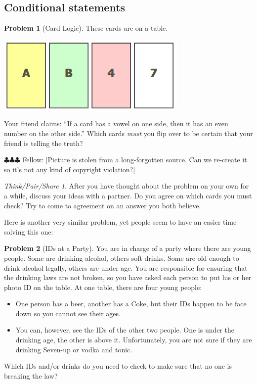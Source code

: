 \documentclass[10pt, reqno]{amsart}
\theoremstyle{remark}
\newtheorem*{thinkpair*}{Think/Pair/Share}
\theoremstyle{definition}
\newtheorem{problem}{Problem}
\numberwithin{equation}{section}  %
\newcommand{\fellow}[1]{{\color{magenta} \sf $\clubsuit\clubsuit\clubsuit$ Fellow: [#1]}}
\begin{document}
\subsection{Conditional statements}
\begin{problem}[Card Logic]
These cards are on a table.
\begin{center}
\includegraphics[height=3 cm]{cards}
\end{center}
Your friend claims: ``If a card has a vowel on one side, then it has an even number on the other side.'' Which cards \emph{must} you flip over to  be certain that your friend is telling the truth?
\end{problem}


\fellow{Picture is stolen from a long-forgotten source.  Can we re-create it so it's not any kind of copyright violation?}


\begin{thinkpair*}
After you have thought about the problem on your own for a while, discuss your ideas with a partner.  Do you agree on which cards you must check?   Try to come to agreement on an answer you both believe.
\end{thinkpair*}

Here is another very similar problem, yet people seem to have an easier time solving this one:


\begin{problem}[IDs at a Party]
You are in charge of a party where there are young people. Some are drinking alcohol, others soft
drinks. Some are old enough to drink alcohol legally, others are under age. You are responsible for
ensuring that the drinking laws are not broken, so you have asked each person to put his or her
photo ID on the table. At one table, there are four young people:
\begin{itemize}
\item
One person has a beer, another has a
Coke, but their IDs happen to be face down so you cannot see their ages. 
\item
You can, however, see the
IDs of the other two people. One is under the drinking age, the other is above it. Unfortunately,
you are not sure if they are drinking Seven-up or vodka and tonic. 
\end{itemize}
Which IDs and/or drinks do you
need to check to make sure that no one is breaking the law?
\end{problem}
\end{document}
